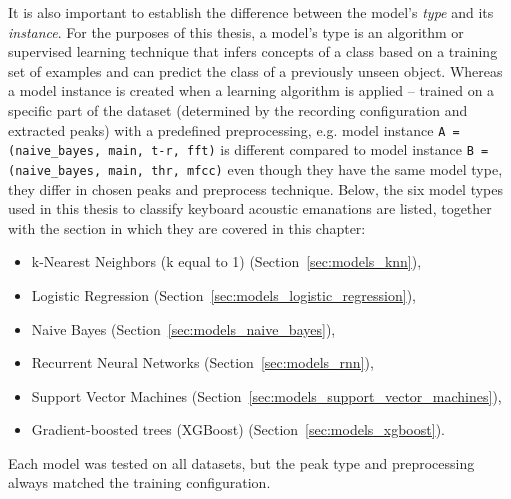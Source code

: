 \documentclass[../main.tex]{subfiles}
\begin{document}
It is also important to establish the difference between the model's \textit{type} and its \textit{instance}. For the purposes of this thesis, a model's type is an algorithm or supervised learning technique that infers concepts of a class based on a training set of examples and can predict the class of a previously unseen object. Whereas a model instance is created when a learning algorithm is applied -- trained on a specific part of the dataset (determined by the recording configuration and extracted peaks) with a predefined preprocessing, e.g. model instance \verb|A = (naive_bayes, main, t-r, fft)| is different compared to model instance \verb|B = (naive_bayes, main, thr, mfcc)| even though they have the same model type, they differ in chosen peaks and preprocess technique.
Below, the six model types used in this thesis to classify keyboard acoustic emanations are listed, together with the section in which they are covered in this chapter:
\begin{multicols}{2}
    \begin{itemize}
        \item k-Nearest Neighbors (k equal to 1) (Section~\ref{sec:models_knn}),
        \item Logistic Regression (Section~\ref{sec:models_logistic_regression}),
        \item Naive Bayes (Section~\ref{sec:models_naive_bayes}),
        \item Recurrent Neural Networks (Section~\ref{sec:models_rnn}),
        \item Support Vector Machines (Section~\ref{sec:models_support_vector_machines}),
        \item Gradient-boosted trees (XGBoost) (Section~\ref{sec:models_xgboost}).
    \end{itemize}
\end{multicols}

Each model was tested on all datasets, but the peak type and preprocessing always matched the training configuration.
\end{document}
